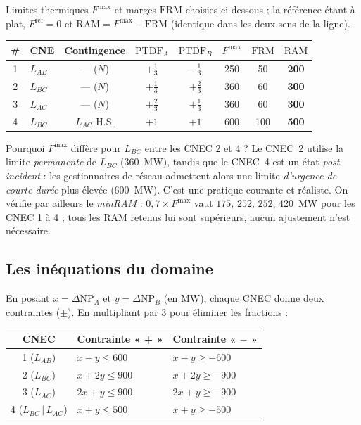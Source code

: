 \documentclass[11pt,a4paper]{article}
\newcommand{\NP}{\mathrm{NP}}
\newcommand{\PTDF}{\mathrm{PTDF}}
\newcommand{\RAM}{\mathrm{RAM}}
\newcommand{\Fmax}{F^{\max}}
\newcommand{\Fref}{F^{\mathrm{ref}}}
\newcommand{\FRM}{\mathrm{FRM}}
\begin{document}
Limites thermiques $\Fmax$ et marges $\FRM$ choisies ci-dessous ; la
référence étant à plat, $\Fref=0$ et $\RAM = \Fmax - \FRM$ (identique dans
les deux sens de la ligne).

\begin{center}
\renewcommand{\arraystretch}{1.25}
\begin{tabular}{c l c c c c c c}
\toprule
\# & CNE & Contingence & $\PTDF_A$ & $\PTDF_B$ & $\Fmax$ & $\FRM$ & $\RAM$ \\
\midrule
1 & $L_{AB}$ & --- ($N$)      & $+\tfrac13$ & $-\tfrac13$ & 250 & 50  & \textbf{200} \\
2 & $L_{BC}$ & --- ($N$)      & $+\tfrac13$ & $+\tfrac23$ & 360 & 60  & \textbf{300} \\
3 & $L_{AC}$ & --- ($N$)      & $+\tfrac23$ & $+\tfrac13$ & 360 & 60  & \textbf{300} \\
4 & $L_{BC}$ & $L_{AC}$ H.S.  & $+1$        & $+1$        & 600 & 100 & \textbf{500} \\
\bottomrule
\end{tabular}
\end{center}

\begin{rembox}{Pourquoi $\Fmax$ diffère pour $L_{BC}$ entre les CNEC 2 et 4 ?}
Le CNEC~2 utilise la limite \emph{permanente} de $L_{BC}$ (360~MW), tandis
que le CNEC~4 est un état \emph{post-incident} : les gestionnaires de réseau
admettent alors une limite \emph{d'urgence de courte durée} plus élevée
(600~MW). C'est une pratique courante et réaliste. On vérifie par ailleurs
le \emph{minRAM} : $0{,}7\times\Fmax$ vaut $175,\,252,\,252,\,420$~MW pour
les CNEC 1 à 4 ; tous les RAM retenus lui sont supérieurs, aucun ajustement
n'est nécessaire.
\end{rembox}

\subsection{Les inéquations du domaine}

En posant $x=\Delta\NP_A$ et $y=\Delta\NP_B$ (en MW), chaque CNEC donne deux
contraintes ($\pm$). En multipliant par 3 pour éliminer les fractions :

\begin{center}
\renewcommand{\arraystretch}{1.3}
\begin{tabular}{c l l}
\toprule
CNEC & Contrainte « + » & Contrainte « $-$ » \\
\midrule
1 ($L_{AB}$)          & $x - y \le 600$   & $x - y \ge -600$ \\
2 ($L_{BC}$)          & $x + 2y \le 900$  & $x + 2y \ge -900$ \\
3 ($L_{AC}$)          & $2x + y \le 900$  & $2x + y \ge -900$ \\
4 ($L_{BC}\,|\,L_{AC}$) & $x + y \le 500$ & $x + y \ge -500$ \\
\bottomrule
\end{tabular}
\end{center}
\end{document}
